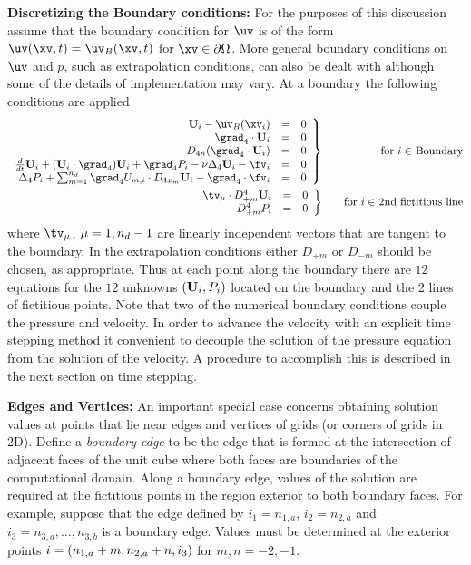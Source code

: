 \documentclass[12pt]{article}
\begin{document}
{\bf Discretizing the Boundary conditions:}
For the purposes of this discussion assume that the boundary condition
for $\uv$ is of the form $\uv(\xv,t)=\uv_B(\xv,t)$ for
$\xv\in\partial\Omega$.  More general boundary conditions on $\uv$ and
$p$, such as extrapolation conditions, can also be dealt with although
some of the details of implementation may vary.
\def\ib {n_{m,a}}
At a boundary the following conditions are applied
\begin{eqnarray*}
   \left. \begin{array}{rcl}
 \uvd_{\id}  -\uv_B(\xv_\id) &=& 0  \\
 \grad_4 \cdot \uvd_{\id}  &=& 0    \\
 D_{4n} ( \grad_4\cdot \uvd_{\id} ) &=& 0  \\
 {d\over dt} \uvd_{\id}
 + (\uvd_{\id}\cdot\grad_4) \uvd_{\id}
  +\grad_4 \pd_{\id}  -\nu\Delta_4 \uvd_{\id}-\fv_{\id}  &=& 0   \\
\Delta_4\pd_{\id} + \PF - \grad_4 \cdot \fv_{\id}   &=& 0
   \end{array} \right\}
     &&~~~\mbox{for $\id\in$ Boundary}                  \\
   \left. \begin{array}{rcl}
  \tv_\mu\cdot \Extrap  \uvd_{\id}     &=& 0  \\
   \Extrap \pd_\id                      &=& 0
   \end{array} \right\}
       &&~~~\mbox{for $\id\in$ 2nd fictitious line}
\end{eqnarray*}
where $\tv_\mu$, $\mu=1,n_d-1$ are linearly independent
vectors that are tangent to the boundary. In the extrapolation conditions
either $D_{+m}$ or $D_{-m}$ should be chosen, as appropriate.
Thus at each point along the boundary
there are $12$ equations for the $12$
unknowns $(\mathbf{U}_{i},{ P}_{i})$ located on the boundary
and the 2 lines of fictitious points.
Note that two of the numerical boundary conditions couple the pressure
and velocity.  In order to advance the velocity with an explicit time
stepping method it convenient to decouple the solution of the pressure
equation from the solution of the velocity.  A procedure to accomplish
this is described in the next section on time stepping.


{\bf Edges and Vertices:}
An important special case concerns obtaining solution values at
points that lie near edges and vertices of grids
(or corners of grids in 2D).  Define a
{\it boundary edge} to be the edge that is formed at the intersection
of adjacent
faces of the unit cube where both faces are boundaries of the
computational domain.
Along a boundary edge, values of the solution are required at the
fictitious points in the region exterior to both boundary
faces.  For example, suppose that the edge defined by
$i_1=n_{1,a}$, $i_2=n_{2,a}$ and $i_3=n_{3,a},\ldots,n_{3,b}$
is a boundary edge.
Values must be determined at the exterior points
$i=(n_{1,a}+m,n_{2,a}+n,i_3)$ for $m,n=-2,-1$.
\end{document}
